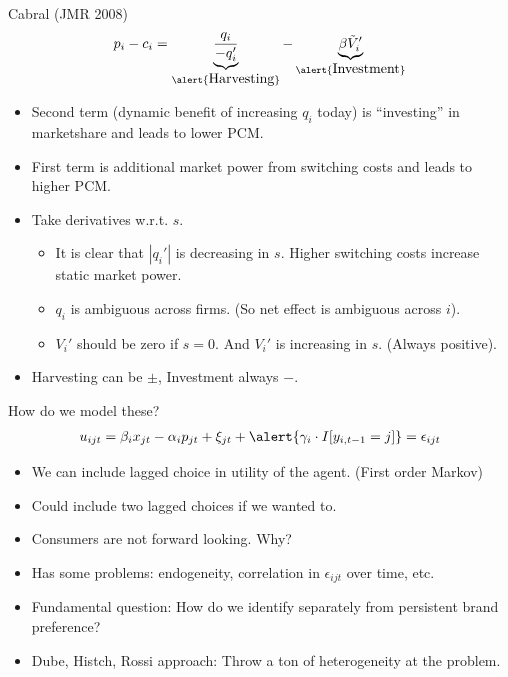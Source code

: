 \documentclass[xcolor=pdftex,dvipsnames,table,mathserif]{beamer}
\begin{document}
\begin{frame}{Cabral (JMR 2008)}
\begin{eqnarray*}
p_i - c_i = \underbrace{\frac{q_i}{-q_i'}}_{\alert{\mbox{Harvesting}}} - \underbrace{\beta \tilde{V}_i'}_{\alert{\mbox{Investment}}}
\end{eqnarray*}
\begin{itemize}
\item Second term (dynamic benefit of increasing $q_i$ today) is ``investing'' in marketshare and leads to lower PCM.
\item First term is additional market power from switching costs and leads to higher PCM.
\item Take derivatives w.r.t. $s$.
\begin{itemize}
\item It is clear that $|q_i'|$ is decreasing in $s$. Higher switching costs increase static market power.
\item $q_i$ is ambiguous across firms. (So net effect is ambiguous across $i$).
\item $V_i'$ should be zero if $s=0$. And $V_i'$ is increasing in $s$. (Always positive).
\end{itemize}
\item Harvesting can be $\pm$, Investment always $-$.
\end{itemize}
\end{frame} 


\begin{frame}{How do we model these?}
\begin{eqnarray*}
u_{ijt} = \beta_i x_{jt} - \alpha_i p_{jt} + \xi_{jt} + \alert{\gamma_i \cdot I[y_{i,t-1}=j]} = \epsilon_{ijt} 
\end{eqnarray*}
\begin{itemize}
\item We can include \alert{lagged choice} in utility of the agent. (First order Markov)
\item Could include two lagged choices if we wanted to.
\item Consumers are \alert{not} forward looking. Why?
\item Has some problems: endogeneity, correlation in $\epsilon_{ijt}$ over time, etc.
\item Fundamental question: How do we identify separately from persistent brand preference?
\item Dube, Histch, Rossi approach: Throw a ton of heterogeneity at the problem.
\end{itemize}
\end{frame} 
\end{document}
